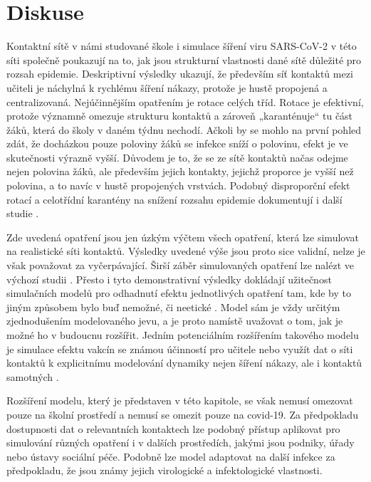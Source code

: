 \section*{Diskuse} 
Kontaktní sítě v námi studované škole i simulace šíření viru SARS-CoV-2 v této síti společně poukazují na to, jak jsou strukturní vlastnosti dané sítě důležité pro rozsah epidemie. Deskriptivní výsledky ukazují, že především síť kontaktů mezi učiteli je náchylná k rychlému šíření nákazy, protože je hustě propojená a centralizovaná. Nejúčinnějším opatřením je rotace celých tříd. Rotace je efektivní, protože významně omezuje strukturu kontaktů a zároveň „karanténuje“ tu část žáků, která do školy v daném týdnu nechodí. Ačkoli by se mohlo na první pohled zdát, že docházkou pouze poloviny žáků se infekce sníží o polovinu, efekt je ve skutečnosti výrazně vyšší. Důvodem je to, že se ze sítě kontaktů načas odejme nejen polovina žáků, ale především jejich kontakty, jejichž proporce je vyšší než polovina, a to navíc v hustě propojených vrstvách. Podobný disproporční efekt rotací a celotřídní karantény na snížení rozsahu epidemie dokumentují i další studie \cite{gemmetto2014mitigation, mcgee2021model}. 

Zde uvedená opatření jsou jen úzkým výčtem všech opatření, která lze simulovat na realistické síti kontaktů. Výsledky uvedené výše jsou proto sice validní, nelze je však považovat za vyčerpávající. Širší záběr simulovaných opatření lze nalézt ve výchozí studii \cite{Brom2021.06.28.21259628}. Přesto i tyto demonstrativní výsledky dokládají užitečnost simulačních modelů pro odhadnutí efektu jednotlivých opatření tam, kde by to jiným způsobem bylo buď nemožné, či neetické \cite{squazzoni2020computational}. Model sám je vždy určitým zjednodušením modelovaného jevu, a je proto namístě uvažovat o tom, jak je možné ho v budoucnu rozšířit. Jedním potenciálním rozšířením takového modelu je simulace efektu vakcín se známou účinností pro učitele \cite{mcgee2021model} nebo využít dat o síti kontaktů k explicitnímu modelování dynamiky nejen šíření nákazy, ale i kontaktů samotných \cite{Rao_etal2021}.

Rozšíření modelu, který je představen v této kapitole, se však nemusí omezovat pouze na školní prostředí a nemusí se omezit pouze na covid-19. Za předpokladu dostupnosti dat o relevantních kontaktech lze podobný přístup aplikovat pro simulování různých opatření i v dalších prostředích, jakými jsou podniky, úřady nebo ústavy sociální péče. Podobně lze model adaptovat na další infekce za předpokladu, že jsou známy jejich virologické a infektologické vlastnosti. 

